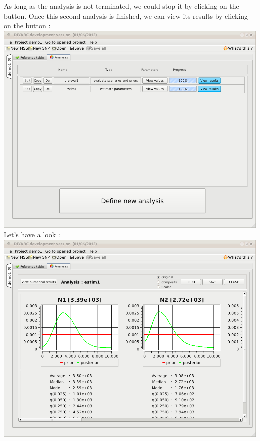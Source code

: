 As long as the analysis is not terminated, we could stop it by clicking on the   button. Once this second analysis is finished, we can view its results by clicking on the   button :\\

\includegraphics[scale=0.35]{gui_pictures/Capture-DIYABC-39.png} \\

Let's have a look :\\

\includegraphics[scale=0.35]{gui_pictures/Capture-DIYABC-40.png} \\

